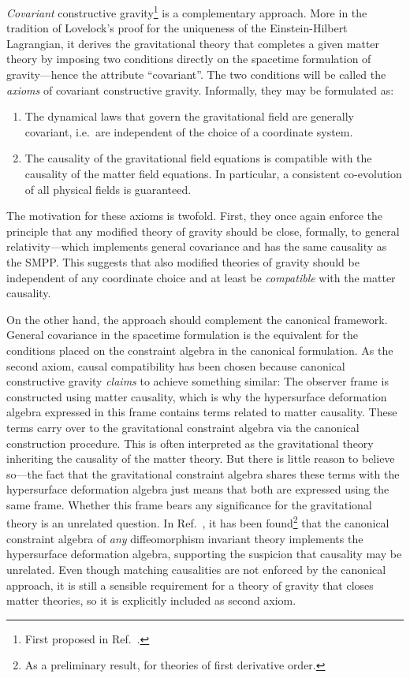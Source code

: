 \emph{Covariant} constructive gravity\footnote{First proposed in Ref.~\cite{Alex_2020}.} is a complementary approach. More in the tradition of Lovelock's proof \cite{Lovelock_1969,Lovelock_1971,Lovelock_1972} for the uniqueness of the Einstein-Hilbert Lagrangian, it derives the gravitational theory that completes a given matter theory by imposing two conditions directly on the spacetime formulation of gravity---hence the attribute ``covariant''. The two conditions will be called the \emph{axioms} of covariant constructive gravity. Informally, they may be formulated as:
\begin{enumerate}
  \item The dynamical laws that govern the gravitational field are generally covariant, i.e.~are independent of the choice of a coordinate system.
  \item The causality of the gravitational field equations is compatible with the causality of the matter field equations. In particular, a consistent co-evolution of all physical fields is guaranteed.
\end{enumerate}
The motivation for these axioms is twofold. First, they once again enforce the principle that any modified theory of gravity should be close, formally, to general relativity---which implements general covariance and has the same causality as the SMPP. This suggests that also modified theories of gravity should be independent of any coordinate choice and at least be \emph{compatible} with the matter causality.

On the other hand, the approach should complement the canonical framework. General covariance in the spacetime formulation is the equivalent for the conditions placed on the constraint algebra in the canonical formulation. As the second axiom, causal compatibility has been chosen because canonical constructive gravity \emph{claims} to achieve something similar: The observer frame is constructed using matter causality, which is why the hypersurface deformation algebra expressed in this frame contains terms related to matter causality. These terms carry over to the gravitational constraint algebra via the canonical construction procedure. This is often interpreted as the gravitational theory inheriting the causality of the matter theory. But there is little reason to believe so---the fact that the gravitational constraint algebra shares these terms with the hypersurface deformation algebra just means that both are expressed using the same frame. Whether this frame bears any significance for the gravitational theory is an unrelated question. In Ref.~\cite{Reinhart_2019}, it has been found\footnote{As a preliminary result, for theories of first derivative order.} that the canonical constraint algebra of \emph{any} diffeomorphism invariant theory implements the hypersurface deformation algebra, supporting the suspicion that causality may be unrelated. Even though matching causalities are not enforced by the canonical approach, it is still a sensible requirement for a theory of gravity that closes matter theories, so it is explicitly included as second axiom.

